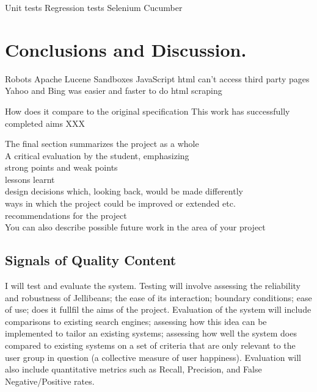 \documentclass[a4paper, 11pt]{article}
\begin{document}
Unit tests
Regression tests
Selenium
Cucumber

\section{Conclusions and Discussion.}

Robots
Apache Lucene
Sandboxes
JavaScript html can't access third party pages
Yahoo and Bing was easier and faster to do html scraping


How does it compare to the original specification
This work has successfully completed aims XXX

The final section summarizes the project as a whole\\
A critical evaluation by the student, emphasizing\\
strong points and weak points\\
lessons learnt\\
design decisions which, looking back, would be made differently\\
ways in which the project could be improved or extended etc.\\
recommendations for the project\\
You can also describe possible future work in the area of your project

\subsection{Signals of Quality Content}
I will test and evaluate the system. Testing will involve assessing the reliability and robustness of Jellibeans; the ease of its interaction; boundary conditions; ease of use; does it fullfil the aims of the project.
Evaluation of the system will include comparisons to existing search engines; assessing how this idea can be implemented to tailor an existing systems; assessing how well the system does compared to existing systems on a set of criteria that are only relevant to the user group in question (a collective measure of user happiness). Evaluation will also include quantitative metrics such as Recall, Precision, and False Negative/Positive rates.
\end{document}
